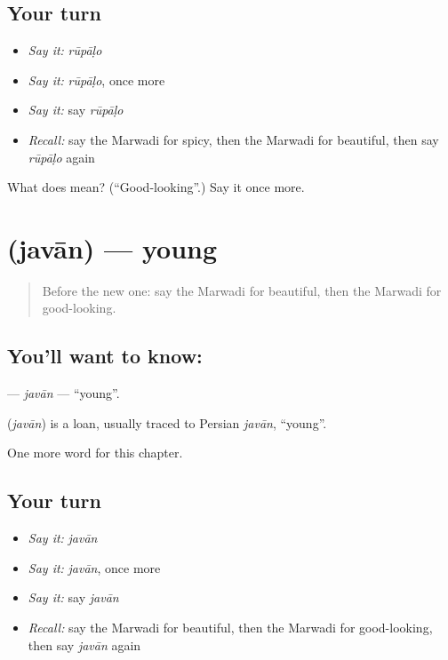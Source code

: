 \subsection*{Your turn}
\begin{itemize}
\raggedright
  \item \emph{Say it:} \emph{rūpāḷo}
  \item \emph{Say it:} \emph{rūpāḷo}, once more
  \item \emph{Say it:} say \emph{rūpāḷo}
  \item \emph{Recall:} say the Marwadi for spicy, then the Marwadi for beautiful, then say \emph{rūpāḷo} again
\end{itemize}

\begin{tcolorbox}[breakable,colback=teal!4,colframe=teal!35!black,title={Before you move on}]
What does  mean? (\textquotedblleft{}Good-looking\textquotedblright{}.) Say it once more.
\end{tcolorbox}
\section[\texorpdfstring{\mw{जवान} (javān)}{जवान (javān)}]{ (javān) — young}

\label{lesson:MW-C144-javan}



\begin{quote}
Before the new one: say the Marwadi for beautiful, then the Marwadi for good-looking.
\end{quote}

\subsection*{You'll want to know: }
\textbf{} — \emph{javān} — \textquotedblleft{}young\textquotedblright{}.

\begin{cousinweb}
\textbf{} (\emph{javān}) is a loan, usually traced to Persian \emph{javān}, \textquotedblleft{}young\textquotedblright{}.
\end{cousinweb}

\begin{grammarlens}[title={What you've built}]
One more word for this chapter.
\end{grammarlens}

\subsection*{Your turn}
\begin{itemize}
\raggedright
  \item \emph{Say it:} \emph{javān}
  \item \emph{Say it:} \emph{javān}, once more
  \item \emph{Say it:} say \emph{javān}
  \item \emph{Recall:} say the Marwadi for beautiful, then the Marwadi for good-looking, then say \emph{javān} again
\end{itemize}

